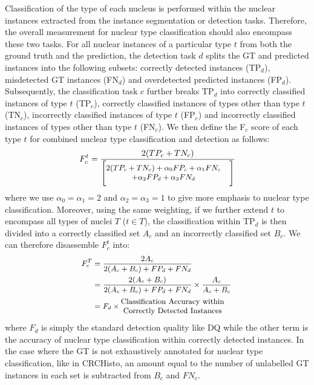 \documentclass[journal]{IEEEtran}
\begin{document}
   Classification of the type of each nucleus is performed within the nuclear instances extracted from the instance segmentation or detection tasks. Therefore, the overall measurement for nuclear type classification should also encompass these two tasks. For all nuclear instances of a particular type $t$ from both the ground truth and the prediction, the detection task $d$ splits the GT and predicted instances into the following subsets: correctly detected instances (TP$_d$), misdetected GT instances (FN$_d$) and overdetected predicted instances (FP$_d$). Subsequently, the classification task $c$ further breaks TP$_d$ into correctly classified instances of type $t$ (TP$_c$), correctly classified instances of types other than type $t$ (TN$_c$), incorrectly classified instances of type $t$ (FP$_c$) and incorrectly classified instances of types other than type $t$ (FN$_c$). We then define the F$_c$ score of each type $t$ for combined nuclear type classification and detection as follows:
    \begin{equation}
	\small
       F_c^t = \frac
                {2 (TP_c + TN_c)}
                {\Bigg[\begin{matrix}2 (TP_c + TN_c) + \alpha_0 FP_c + \alpha_1 FN_c&\\
                + \alpha_2 FP_d + \alpha_3 FN_d\end{matrix}\Bigg]}
    \end{equation}
    \noindent where we use $\alpha_0=\alpha_1=2$ and $\alpha_2=\alpha_3=1$ to give more emphasis to nuclear type classification. Moreover, using the same weighting, if we further extend $t$ to encompass all types of nuclei $T$ ($t \in T$), the classification within TP$_d$ is then divided into a correctly classified set $A_{c}$ and an incorrectly classified set $B_{c}$. We can therefore disassemble $F_c^t$ into:
    \begin{equation}
	\small
	\begin{split}
        F_c^T
              & = \frac{2 A_c}{2 (A_{c} + B_{c}) + FP_d + FN_d} \\
              & = \frac {2 (A_{c} + B_{c})}{2 (A_{c} + B_{c}) + FP_d + FN_d} \times \frac{A_{c}}{A_{c} + B_{c}} \\
              & = F_d \times \begin{matrix}\textnormal{Classification Accuracy within}&\\\textnormal{Correctly Detected Instances}\end{matrix}
    \end{split}
    \end{equation}
    where $F_d$ is simply the standard detection quality like DQ while the other term is the accuracy of nuclear type classification within correctly detected instances. In the case where the GT is not exhaustively annotated for nuclear type classification, like in CRCHisto, an amount equal to the number of unlabelled GT instances in each set is subtracted from $B_c$ and $FN_c$. 
    
\end{document}
